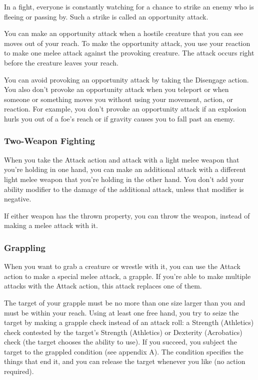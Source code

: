 In a fight, everyone is constantly watching for a chance to strike an enemy who is fleeing or passing by. Such a strike is called an opportunity attack.

You can make an opportunity attack when a hostile creature that you can see moves out of your reach. To make the opportunity attack, you use your reaction to make one melee attack against the provoking creature. The attack occurs right before the creature leaves your reach.

You can avoid provoking an opportunity attack by taking the Disengage action. You also don't provoke an opportunity attack when you teleport or when someone or something moves you without using your movement, action, or reaction. For example, you don't provoke an opportunity attack if an explosion hurls you out of a foe's reach or if gravity causes you to fall past an enemy.

\subsubsection{Two-Weapon Fighting}

When you take the Attack action and attack with a light melee weapon that you're holding in one hand, you can make an additional attack with a different light melee weapon that you're holding in the other hand. You don't add your ability modifier to the damage of the additional attack, unless that modifier is negative.

If either weapon has the thrown property, you can throw the weapon, instead of making a melee attack with it.

\subsubsection{Grappling}

When you want to grab a creature or wrestle with it, you can use the Attack action to make a special melee attack, a grapple. If you're able to make multiple attacks with the Attack action, this attack replaces one of them.

The target of your grapple must be no more than one size larger than you and must be within your reach. Using at least one free hand, you try to seize the target by making a grapple check instead of an attack roll: a Strength (Athletics) check contested by the target's Strength (Athletics) or Dexterity (Acrobatics) check (the target chooses the ability to use). If you succeed, you subject the target to the grappled condition (see appendix A). The condition specifies the things that end it, and you can release the target whenever you like (no action required).

